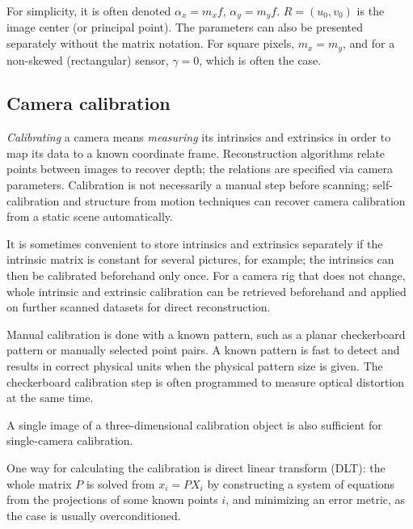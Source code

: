 For simplicity, it is often denoted $\alpha_x = m_x f$, $\alpha_y = m_y f$.
$R = (u_0, v_0)$ is the image center (or principal point).
The parameters can also be presented separately without the matrix notation.
For square pixels, $m_x = m_y$, and for a non-skewed (rectangular) sensor, $\gamma = 0$, which is often the case. \cite{hartley03multiview,szeliski10vision,heyden2005multiple}



\subsection{Camera calibration} %

\emph{Calibrating} a camera means \emph{measuring} its intrinsics and extrinsics in order to map its data to a known coordinate frame.
Reconstruction algorithms relate points between images to recover depth; the relations are specified via camera parameters.
Calibration is not necessarily a manual step before scanning;
self-calibration and structure from motion techniques can recover camera calibration from a static scene automatically. \cite{pollefeys1999hand,hartley03multiview}

It is sometimes convenient to store intrinsics and extrinsics separately if the intrinsic matrix is constant for several pictures, for example;
the intrinsics can then be calibrated beforehand only once.
For a camera rig that does not change, whole intrinsic and extrinsic calibration can be retrieved beforehand and applied on further scanned datasets for direct reconstruction.

Manual calibration is done with a known pattern, such as a planar checkerboard pattern \cite{chuang2002performance,zhang2000flexible} or manually selected point pairs.
A known pattern is fast to detect and results in correct physical units when the physical pattern size is given.
The checkerboard calibration step is often programmed to measure optical distortion at the same time. \cite{opencv,camcalmatlab}

A single image of a three-dimensional calibration object is also sufficient for single-camera calibration. \cite{jokukirjoist}

One way for calculating the calibration is direct linear transform (DLT):
the whole matrix $P$ is solved from $x_i = PX_i$ by constructing a system of equations from the projections of some known points $i$, and minimizing an error metric, as the case is usually overconditioned. \cite{hartley03multiview}

